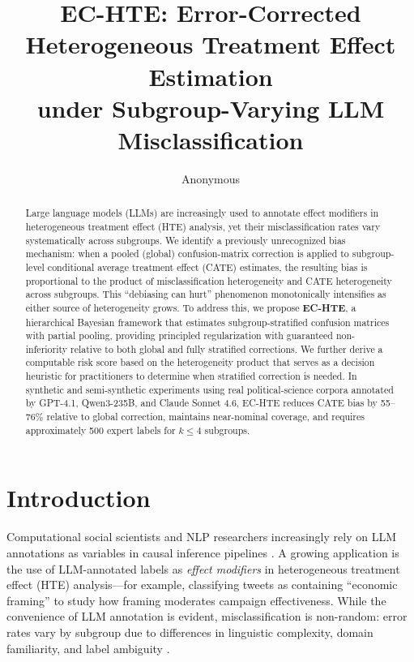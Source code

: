 \documentclass[11pt,a4paper]{article}
\title{EC-HTE: Error-Corrected Heterogeneous Treatment Effect Estimation\\under Subgroup-Varying LLM Misclassification}
\author{Anonymous}
\date{}
\begin{document}
\maketitle

\begin{abstract}
Large language models (LLMs) are increasingly used to annotate effect modifiers in heterogeneous treatment effect (HTE) analysis, yet their misclassification rates vary systematically across subgroups.
We identify a previously unrecognized bias mechanism: when a pooled (global) confusion-matrix correction is applied to subgroup-level conditional average treatment effect (CATE) estimates, the resulting bias is proportional to the product of misclassification heterogeneity and CATE heterogeneity across subgroups.
This ``debiasing can hurt'' phenomenon monotonically intensifies as either source of heterogeneity grows.
To address this, we propose \textbf{EC-HTE}, a hierarchical Bayesian framework that estimates subgroup-stratified confusion matrices with partial pooling, providing principled regularization with guaranteed non-inferiority relative to both global and fully stratified corrections.
We further derive a computable risk score based on the heterogeneity product that serves as a decision heuristic for practitioners to determine when stratified correction is needed.
In synthetic and semi-synthetic experiments using real political-science corpora annotated by GPT-4.1, Qwen3-235B, and Claude Sonnet 4.6, EC-HTE reduces CATE bias by 55--76\% relative to global correction, maintains near-nominal coverage, and requires approximately 500 expert labels for $k \leq 4$ subgroups.
\end{abstract}

\section{Introduction}

Computational social scientists and NLP researchers increasingly rely on LLM annotations as variables in causal inference pipelines \citep{egami2024dsl,angelopoulos2023ppi}.
A growing application is the use of LLM-annotated labels as \emph{effect modifiers} in heterogeneous treatment effect (HTE) analysis---for example, classifying tweets as containing ``economic framing'' to study how framing moderates campaign effectiveness.
While the convenience of LLM annotation is evident, misclassification is non-random: error rates vary by subgroup due to differences in linguistic complexity, domain familiarity, and label ambiguity \citep{ashwin2025}.
\end{document}
